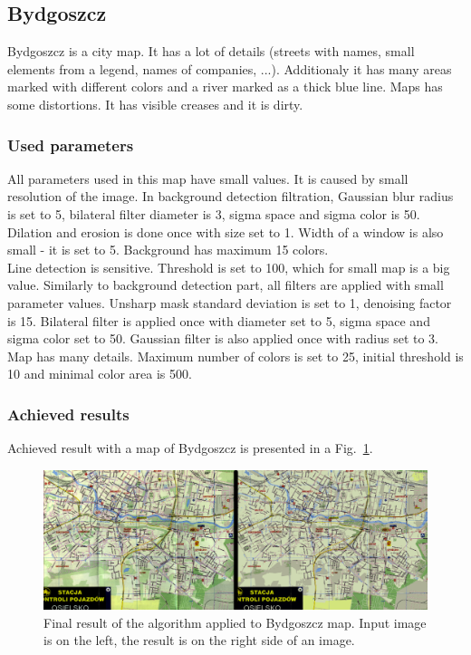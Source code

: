 \documentclass[a4paper,onecolumn,oneside,12pt]{memoir}
\begin{document}
\subsection{Bydgoszcz}

Bydgoszcz is a city map. It has a lot of details (streets with names, small elements from a legend,
names of companies, ...). Additionaly it has many areas marked with different colors and a river
marked as a thick blue line. Maps has some distortions. It has visible creases and it is dirty.

\subsubsection{Used parameters}

All parameters used in this map have small values. It is caused by small resolution of the image. 
In background detection filtration, Gaussian blur radius is set to 5, bilateral filter diameter is
3, sigma space and sigma color is 50. Dilation and erosion is done once with size set to 1. Width
of a window is also small - it is set to 5. Background has maximum 15 colors. \\

Line detection is sensitive. Threshold is set to 100, which for small map is a big value. Similarly
to background detection part, all filters are applied with small parameter values. Unsharp mask
standard deviation is set to 1, denoising factor is 15. Bilateral filter is applied once with
diameter set to 5, sigma space and sigma color set to 50. Gaussian filter is also applied once with
radius set to 3. Map has many details. Maximum number of colors is set to 25, initial threshold is
10 and minimal color area is 500.

\subsubsection{Achieved results}

Achieved result with a map of Bydgoszcz is presented in a Fig.~\ref{bydgoszczResult}.

\begin{figure}[!ht]
\begin{center}
\includegraphics[scale=0.4]{images/bydgoszczFinalResult.png}
\caption{Final result of the algorithm applied to Bydgoszcz map. Input image is on the left, the
result is on the right side of an image.}
\label{bydgoszczResult}
\end{center}
\end{figure}
\end{document}
